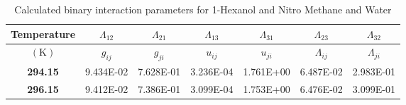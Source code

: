 
\begin{table}
\begin{tabularx}{\textwidth}{c|cc|cc|cc}
\hline
\textbf{Temperature}&$\Lambda_12$&$\Lambda_21$&$\Lambda_13$&$\Lambda_31$&$\Lambda_23$&$\Lambda_32$\\
\hline
\hline
$\left(\mathrm{K}\right)$&$g_{ij}$&$g_{ji}$&$u_{ij}$&$u_{ji}$&$\Lambda_{ij}$&$\Lambda_{ji}$\\
\hline
\textbf{ 294.15 } & 9.434E-02 & 7.628E-01 & 3.236E-04 & 1.761E+00 & 6.487E-02 & 2.983E-01\\
\textbf{ 296.15 } & 9.412E-02 & 7.386E-01 & 3.099E-04 & 1.753E+00 & 6.476E-02 & 3.099E-01\\
\hline 
\end{tabularx}\\
\caption{Calculated binary interaction parameters for 1-Hexanol and Nitro Methane and Water} \label{1-hexanol-methanenitro-waterTable}
\end{table}